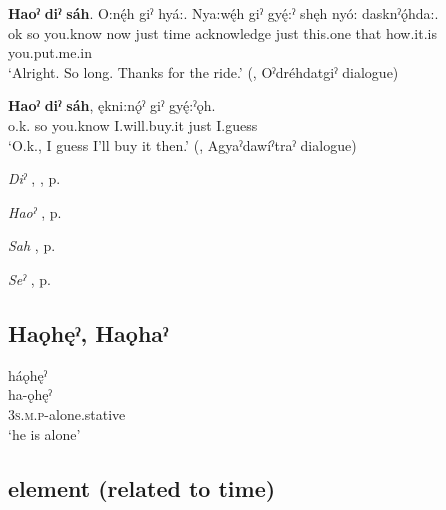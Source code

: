 \ea
\label{ex:hpar7}
\gll \textbf{Haoˀ} \textbf{diˀ} \textbf{sáh}. O:nę́h giˀ hyá:. Nya:wę́h giˀ gyę́:ˀ shęh nyó: dasknˀǫ́hda:.\\
ok so you.know now just time acknowledge just this.one that how.it.is you.put.me.in\\
\glt ‘Alright. So long. Thanks for the ride.’ (\cite[339]{mithun_watewayestanih_1984}, Oˀdréhdatgiˀ dialogue)
\z

\ea
\label{ex:hpar8}
\gll \textbf{Haoˀ} \textbf{diˀ} \textbf{sáh}, ękni:nǫ́ˀ giˀ gyę́:ˀǫh.\\
o.k. so you.know I.will.buy.it just I.guess\\
\glt ‘O.k., I guess I’ll buy it then.’ (\cite[225]{mithun_watewayestanih_1984}, Agyaˀdawíˀtraˀ dialogue)
\z

\begin{CayugaRelated}
\item \textit{Diˀ} , , p. \pageref{p:[diˀ]}\\
\item \textit{Haoˀ} , p. \pageref{p:[haoˀ] ‘o.k.!’}\\
\item \textit{Sah} , p. \pageref{p:[sah]}\\
\item \textit{Seˀ} , p. \pageref{p:[seˀ]}
\end{CayugaRelated}


\subsection*{\textbf{Haǫhęˀ, Haǫhaˀ} } \label{p:[haǫhęˀ]}
\clearpage
\ea
\label{ex:hpar9} háǫhęˀ\\
\gll ha-ǫhęˀ\\
\textsc{3s.m.p}-alone.stative\\
\glt ‘he is alone’
\z



\subsection*{ element (related to time)} \label{p:[-heh]}

